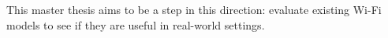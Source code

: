 This master thesis aims to be a step in this direction: evaluate existing Wi-Fi models to see if they are useful in real-world settings.















